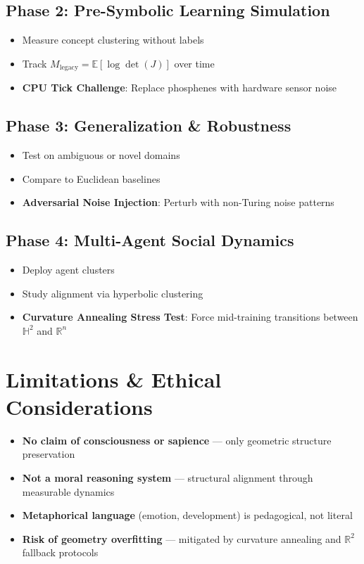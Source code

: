 \documentclass[10pt]{article}
\begin{document}
\subsection{Phase 2: Pre-Symbolic Learning Simulation}  
\begin{itemize}
    \item Measure concept clustering without labels
    \item Track $M_{\text{legacy}} = \mathbb{E}[\log \det(J)]$ over time
    \item \textbf{CPU Tick Challenge}: Replace phosphenes with hardware sensor noise
\end{itemize}

\subsection{Phase 3: Generalization \& Robustness}
\begin{itemize}
    \item Test on ambiguous or novel domains
    \item Compare to Euclidean baselines
    \item \textbf{Adversarial Noise Injection}: Perturb with non-Turing noise patterns
\end{itemize}

\subsection{Phase 4: Multi-Agent Social Dynamics}
\begin{itemize}
    \item Deploy agent clusters  
    \item Study alignment via hyperbolic clustering
    \item \textbf{Curvature Annealing Stress Test}: Force mid-training transitions between $\mathbb{H}^2$ and $\mathbb{R}^n$
\end{itemize}

\section{Limitations \& Ethical Considerations}

\begin{itemize}
    \item \textbf{No claim of consciousness or sapience} — only geometric structure preservation
    \item \textbf{Not a moral reasoning system} — structural alignment through measurable dynamics
    \item \textbf{Metaphorical language} (emotion, development) is pedagogical, not literal
    \item \textbf{Risk of geometry overfitting} — mitigated by curvature annealing and $\mathbb{R}^2$ fallback protocols
\end{itemize}
\end{document}
